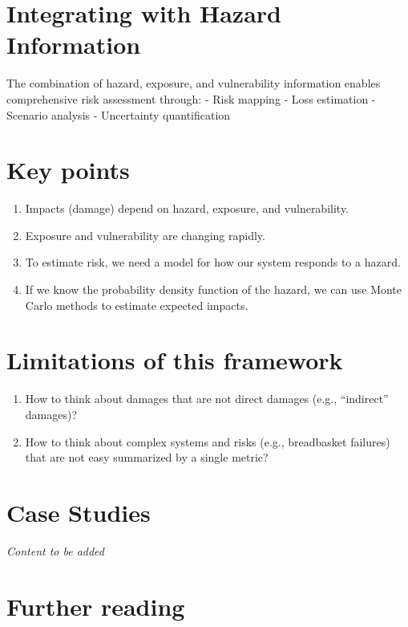 \documentclass[
  letterpaper,
  DIV=11,
  numbers=noendperiod]{scrreprt}
\providecommand{\tightlist}{%
  \setlength{\itemsep}{0pt}\setlength{\parskip}{0pt}}
\begin{document}
\section{Integrating with Hazard
Information}\label{integrating-with-hazard-information}

The combination of hazard, exposure, and vulnerability information
enables comprehensive risk assessment through: - Risk mapping - Loss
estimation - Scenario analysis - Uncertainty quantification

\section{Key points}\label{key-points}

\begin{enumerate}
\def\labelenumi{\arabic{enumi}.}
\tightlist
\item
  Impacts (damage) depend on hazard, exposure, and vulnerability.
\item
  Exposure and vulnerability are changing rapidly.
\item
  To estimate risk, we need a model for how our system responds to a
  hazard.
\item
  If we know the probability density function of the hazard, we can use
  Monte Carlo methods to estimate expected impacts.
\end{enumerate}

\section{Limitations of this
framework}\label{limitations-of-this-framework}

\begin{enumerate}
\def\labelenumi{\arabic{enumi}.}
\tightlist
\item
  How to think about damages that are not direct damages (e.g.,
  ``indirect'' damages)?
\item
  How to think about complex systems and risks (e.g., breadbasket
  failures) that are not easy summarized by a single metric?
\end{enumerate}

\section{Case Studies}\label{case-studies-1}

\emph{Content to be added}

\section{Further reading}\label{further-reading-13}
\end{document}
